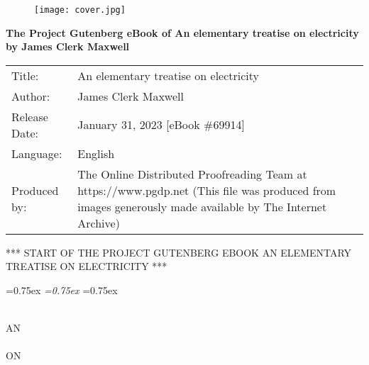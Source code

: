 \documentclass[12pt,oneside]{book}[2021/10/04]
\newcommand{\¬}{\hphantom{0}}
\newenvironment{PGtext}{\thispagestyle{empty}
\raggedright \pgfont
\setlength\parskip{5pt plus1pt}}{}
\begin{document}

\thispagestyle{empty}
\begin{figure}[tbp]
\texttt{[image: cover.jpg]}
\centering
\end{figure}
\restoregeometry

\newpage
\begin{PGtext}
\begin{center}
\large
\textbf{
The Project Gutenberg eBook of An elementary treatise on electricity by James Clerk Maxwell
}
\end{center}
\renewcommand*{\arraystretch}{1.5}
\begin{tabular}{p{2.5cm}>{\raggedright\arraybackslash}p{\dimexpr \linewidth-3.5cm}}
Title: &        An elementary treatise on electricity\\
Author: &       James Clerk Maxwell\\
Release Date: & January 31, 2023 [eBook \#69914]\\
Language: &     English\\
Produced by: &  The Online Distributed Proofreading Team at https://www.pgdp.net (This file was produced from images generously made available by The Internet Archive)\\
\end{tabular}
\vfill
\begin{center}
*** START OF THE PROJECT GUTENBERG EBOOK AN ELEMENTARY TREATISE ON ELECTRICITY ***
\end{center}
\end{PGtext}
\pagestyle{fancy}
\fancyhf{}
\fancyhead[R]{\iffloatpage{}{\thepage}}

\frontmatter
{}\font=0.75ex%
\textit{\font=0.75ex}
{\small{\font=0.75ex}}
\thispagestyle{empty}
\vspace{3cm}
\begin{center}
{\Large\gfont {}}\\[4cm]
AN\\[0.5cm]
\Large
{}\\[0.5cm]
\small
ON\\[0.5cm]
\Huge
{}\\[0.9cm]
\large
\textit{}
\end{center}
\end{document}
